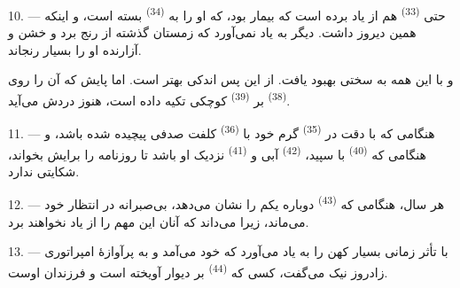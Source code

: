 \VUsaut{4.2mm}
\VUsaut{3.0mm}

10. --- حتی  \textsuperscript{(33)} هم از یاد برده است
که بیمار بود، که  او را به 
\textsuperscript{(34)} بسته است، و اینکه همین دیروز  داشت. دیگر به یاد نمی‌آورد که زمستان گذشته از 
رنج برد و  خشن و آزارنده او را بسیار رنجاند.

و با این همه به سختی بهبود یافت. از این پس اندکی بهتر است. اما پایش
که آن را روی  \textsuperscript{(38)} بر
 \textsuperscript{(39)} کوچکی تکیه داده است، هنوز
دردش می‌آید.

11. --- هنگامی که با دقت در  \textsuperscript{(35)}
گرم خود با  \textsuperscript{(36)} کلفت صدفی پیچیده
شده باشد، و هنگامی که  \textsuperscript{(40)} با
 سپید،  \textsuperscript{(42)} آبی و
 \textsuperscript{(41)} نزدیک او باشد تا روزنامه را برایش
بخواند، شکایتی ندارد.

12. --- هر سال، هنگامی که  \textsuperscript{(43)} دوباره
 یکم  را نشان می‌دهد، بی‌صبرانه در انتظار
 خود می‌ماند، زیرا می‌داند که آنان این 
مهم را از یاد نخواهند برد.

13. --- با تأثر زمانی بسیار کهن را به یاد می‌آورد که خود می‌آمد و به
 پرآوازهٔ امپراتوری زادروز نیک می‌گفت، کسی که
 \textsuperscript{(44)} بر دیوار آویخته است و
 فرزندان اوست.

\VUsaut{6.0mm}
\VUfilet{22mm}
